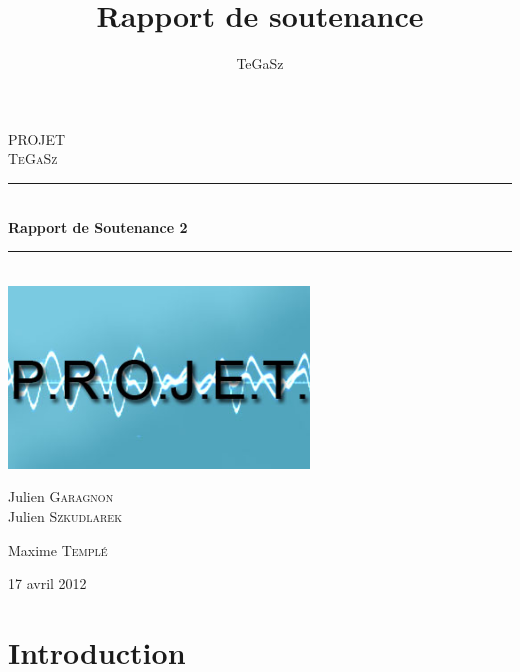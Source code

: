 \documentclass[12pt,a4paper]{report}
\title{Rapport de soutenance \no{2}}
\date{}
\author{TeGaSz}
\newcommand{\HRule}{\rule{\linewidth}{0.5mm}}
\begin{document}
\begin{titlepage}



\begin{center}



\textsc{\LARGE PROJET}\\[1.5cm]

\textsc{\Large TeGaSz}\\[0.5cm]


\HRule \\[0.4cm]
{ \huge \bfseries Rapport de Soutenance 2}\\[0.4cm]
  
\HRule \\[1.5cm]
\includegraphics[width=0.6\textwidth]{./name.jpg}\\[1cm]  
\begin{minipage}{0.4\textwidth}
\begin{flushleft} \large
Julien \textsc{Garagnon}\\
Julien \textsc{Szkudlarek}
\end{flushleft}
\end{minipage}
\begin{minipage}{0.4\textwidth}
\begin{flushright} \large
Maxime \textsc{Templé}\\

\end{flushright}
\end{minipage}

\vfill

{\large 17 avril 2012}

\end{center}

\end{titlepage}
\tableofcontents

\chapter{Introduction}
\end{document}
